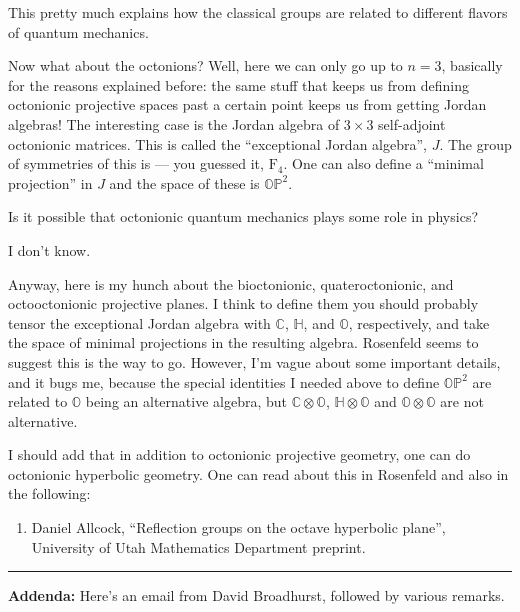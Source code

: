 \documentclass{article}
\def\tightlist{}
\begin{document}
This pretty much explains how the classical groups are related to
different flavors of quantum mechanics.

Now what about the octonions? Well, here we can only go up to \(n = 3\),
basically for the reasons explained before: the same stuff that keeps us
from defining octonionic projective spaces past a certain point keeps us
from getting Jordan algebras! The interesting case is the Jordan algebra
of \(3\times3\) self-adjoint octonionic matrices. This is called the
``exceptional Jordan algebra'', \(J\). The group of symmetries of this
is --- you guessed it, \(\mathrm{F}_4\). One can also define a ``minimal
projection'' in \(J\) and the space of these is \(\mathbb{OP}^2\).

Is it possible that octonionic quantum mechanics plays some role in
physics?

I don't know.

Anyway, here is my hunch about the bioctonionic, quateroctonionic, and
octooctonionic projective planes. I think to define them you should
probably tensor the exceptional Jordan algebra with \(\mathbb{C}\),
\(\mathbb{H}\), and \(\mathbb{O}\), respectively, and take the space of
minimal projections in the resulting algebra. Rosenfeld seems to suggest
this is the way to go. However, I'm vague about some important details,
and it bugs me, because the special identities I needed above to define
\(\mathbb{OP}^2\) are related to \(\mathbb{O}\) being an alternative
algebra, but \(\mathbb{C}\otimes\mathbb{O}\),
\(\mathbb{H}\otimes\mathbb{O}\) and \(\mathbb{O}\otimes\mathbb{O}\) are
not alternative.

I should add that in addition to octonionic projective geometry, one can
do octonionic hyperbolic geometry. One can read about this in Rosenfeld
and also in the following:

\begin{enumerate}
\def\labelenumi{\arabic{enumi})}
\setcounter{enumi}{5}
\tightlist
\item
  Daniel Allcock, ``Reflection groups on the octave hyperbolic plane'',
  University of Utah Mathematics Department preprint.
\end{enumerate}

\begin{center}\rule{0.5\linewidth}{0.5pt}\end{center}

\textbf{Addenda:} Here's an email from David Broadhurst, followed by
various remarks.
\end{document}

